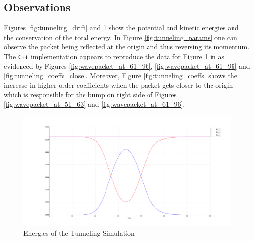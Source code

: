 \subsection{Observations}
Figures \ref{fig:tunneling_drift} and \ref{fig:tunneling_energy} show the potential and kinetic energies and the conservation of the total energy.
In Figure \ref{fig:tunneling_params} one can observe the packet being reflected at the origin and thus reversing its momentum.
The \texttt{C++} implementation appears to reproduce the data for Figure 1 in \cite{GHJ_tunneling_spawning} as evidenced by Figures \ref{fig:wavepacket_at_61_96}, \ref{fig:wavepacket_at_61_96} and \ref{fig:tunneling_coeffs_close}.  
Moreover, Figure \ref{fig:tunneling_coeffs} shows the increase in higher order coefficients when the packet gets closer to the origin which is responsible for the bump on right side of Figures \ref{fig:wavepacket_at_51_63} and \ref{fig:wavepacket_at_61_96}.
\begin{figure}
\includegraphics[width=\textwidth]{Figures/tunneling_energy.pdf}
\caption{Energies of the Tunneling Simulation}
\label{fig:tunneling_energy}
\end{figure}

